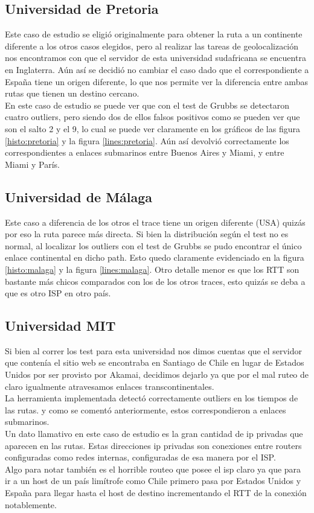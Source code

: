 \subsection{Universidad de Pretoria}
Este caso de estudio se eligió originalmente para obtener la ruta a un continente diferente a los otros casos elegidos, pero al realizar las tareas de geolocalización nos encontramos con que el servidor de esta universidad sudafricana se encuentra en Inglaterra. Aún así se decidió no cambiar el caso dado que el correspondiente a España tiene un origen diferente, lo que nos permite ver la diferencia entre ambas rutas que tienen un destino cercano. \\
En este caso de estudio se puede ver que con el test de Grubbs se detectaron cuatro outliers, pero siendo dos de ellos falsos positivos como se pueden ver que son el salto 2 y el 9, lo cual se puede ver claramente en los gráficos de las figura \ref{histo:pretoria} y la figura \ref{lines:pretoria}. Aún así devolvió correctamente los correspondientes a enlaces submarinos entre Buenos Aires y Miami, y entre Miami y París.

\subsection{Universidad de Málaga}
Este caso a diferencia de los otros el trace tiene un origen diferente (USA) quizás por eso la ruta parece más directa.
Si bien la distribución según el test no es normal, al localizar los outliers con el test de Grubbs se pudo encontrar el único enlace continental en dicho path. Esto quedo claramente evidenciado en la figura \ref{histo:malaga} y la figura \ref{lines:malaga}.
Otro detalle menor es que los RTT son bastante más chicos comparados con los de los otros traces, esto quizás se deba a que es otro ISP en otro país.



\subsection{Universidad MIT}
Si bien al correr los test para esta universidad nos dimos cuentas que el servidor que contenía el sitio web se encontraba en Santiago de Chile en lugar de Estados Unidos por ser provisto por Akamai, decidimos dejarlo ya que por el mal ruteo de claro igualmente atravesamos enlaces transcontinentales.\\
La herramienta implementada detectó correctamente outliers en los tiempos de las rutas. y como se comentó anteriormente, estos correspondieron a enlaces submarinos.\\ 
Un dato llamativo en este caso de estudio es la gran cantidad de ip privadas que aparecen en las rutas. Estas direcciones ip privadas son conexiones entre routers configuradas como redes internas, configuradas de esa manera por el ISP.\\
Algo para notar también es el horrible routeo que posee el isp claro ya que para ir a un host de un país limítrofe como Chile primero pasa por Estados Unidos y España para llegar hasta el host de destino incrementando el RTT de la conexión notablemente.

